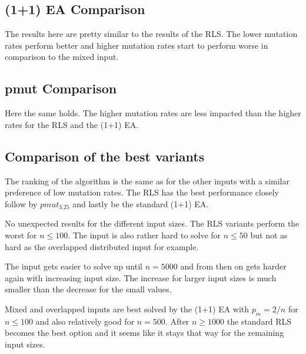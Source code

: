 \subsection{(1+1) EA Comparison}




The results here are pretty similar to the results of the RLS.
The lower mutation rates perform better and higher mutation rates start to perform worse in comparison to the mixed input.
\subsection{pmut Comparison}




Here the same holds.
The higher mutation rates are less impacted than the higher rates for the RLS and the (1+1) EA.
\subsection{Comparison of the best variants}




The ranking of the algorithm is the same as for the other inputs with a similar preference of low mutation rates.
The RLS has the best performance closely follow by $pmut_{3.25}$ and lastly be the standard (1+1) EA.



No unexpected results for the different input sizes.
The RLS variants perform the worst for $n\le 100$.
The input is also rather hard to solve for $n\le50$ but not as hard as the overlapped distributed input for example.



The input gets easier to solve up until $n=5000$ and from then on gets harder again with increasing input size.
The increase for larger input sizes is much smaller than the decrease for the small values.



Mixed and overlapped inputs are best solved by the (1+1) EA with $p_m=2/n$ for $n\le100$ and also relatively good for $n=500$.
After $n\ge1000$ the standard RLS becomes the best option and it seems like it stays that way for the remaining input sizes.
